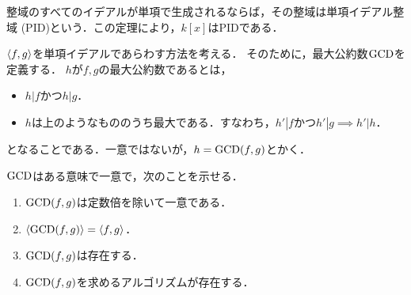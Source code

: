 \documentclass[9pt]{ltjsarticle}
\begin{document}
整域のすべてのイデアルが単項で生成されるならば，その整域は単項イデアル整域
(PID)という．この定理により，$k[x]$はPIDである．

$\left\langle f,g \right\rangle$を単項イデアルであらわす方法を考える．
そのために，最大公約数${\rm GCD}$を定義する．
$h$が$f,g$の最大公約数であるとは，
\begin{itemize}
 \item $h|f$かつ$h|g$．
 \item $h$は上のようなもののうち最大である．すなわち，$h'|f かつ h'|g \implies h'|h$．
\end{itemize}
となることである．一意ではないが，$h={\rm GCD}(f,g)$とかく．

${\rm GCD}$はある意味で一意で，次のことを示せる．
\begin{enumerate}[label=(\arabic*)]
 \item ${\rm GCD}(f,g)$は定数倍を除いて一意である．
 \item $\left\langle {\rm GCD}(f,g) \right\rangle=\left\langle f,g \right\rangle$．
 \item ${\rm GCD}(f,g)$は存在する．
 \item ${\rm GCD}(f,g)$を求めるアルゴリズムが存在する．
\end{enumerate}
\end{document}
